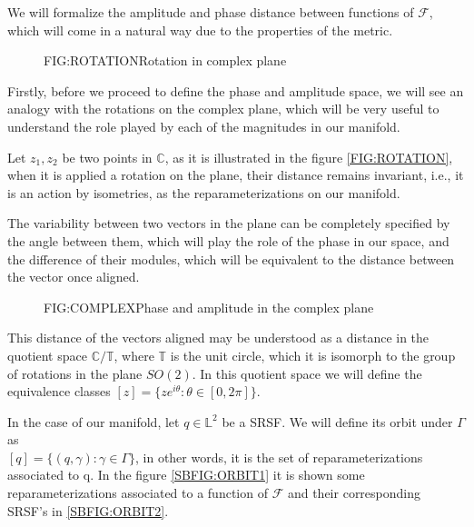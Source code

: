 
We will formalize the amplitude and phase distance between functions of
$\mathcal{F}$, which will come in a natural way due to the properties of the
metric.

\begin{figure}[Rotation in complex plane]{FIG:ROTATION}{Rotation in complex plane}
\end{figure}

Firstly, before we proceed to define the phase and amplitude space, we will see
an analogy with the rotations on the complex plane, which will be very useful to
understand the role played by each of the magnitudes in our manifold.

Let  $z_1, z_2$ be two points in $\mathbb{C}$, as it is illustrated in the
figure \ref{FIG:ROTATION}, when it is applied a rotation on the plane, their
distance remains invariant, i.e., it is an action by isometries, as the
reparameterizations on our manifold.


The variability between two vectors in the plane can be completely specified by
the angle between them, which will play the role of the phase in our space, and
the difference of their modules, which will be equivalent to the distance
between the vector once aligned.

\begin{figure}[Phase and amplitude in the complex plane]{FIG:COMPLEX}{Phase and amplitude in the complex plane}

 \quad
{}

\end{figure}


This distance of the vectors aligned may be understood as a distance in the
quotient space $\mathbb{C} / \mathbb{T}$, where $\mathbb{T}$ is the unit circle,
which it is isomorph to the group of rotations in the plane $SO(2)$. In this
quotient space we will define the equivalence classes
$[z] = \{z e^{i \theta} : \theta \in [0, 2\pi]\}$.

In the case of our manifold, let $q \in \mathbb{L}^2$ be a SRSF. We will define
its orbit under $\Gamma$ as \\$[q] = \{(q, \gamma) : \gamma \in \Gamma \}$, in
other words, it is the set of reparameterizations associated to q. In the
figure \ref{SBFIG:ORBIT1} it is shown some reparameterizations associated  to a function
of $\mathscr{F}$ and their corresponding SRSF's in \ref{SBFIG:ORBIT2}.


